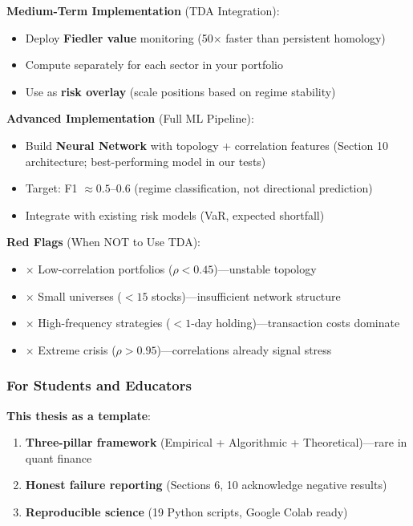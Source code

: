 \textbf{Medium-Term Implementation} (TDA Integration):
\begin{itemize}
\item Deploy \textbf{Fiedler value} monitoring (50$\times$ faster than persistent homology)
\item Compute separately for each sector in your portfolio
\item Use as \textbf{risk overlay} (scale positions based on regime stability)
\end{itemize}

\textbf{Advanced Implementation} (Full ML Pipeline):
\begin{itemize}
\item Build \textbf{Neural Network} with topology + correlation features (Section 10 architecture; best-performing model in our tests)
\item Target: F1 $\approx 0.5$--$0.6$ (regime classification, not directional prediction)
\item Integrate with existing risk models (VaR, expected shortfall)
\end{itemize}

\textbf{Red Flags} (When NOT to Use TDA):
\begin{itemize}
\item $\times$ Low-correlation portfolios ($\rho < 0.45$)---unstable topology
\item $\times$ Small universes ($< 15$ stocks)---insufficient network structure
\item $\times$ High-frequency strategies ($< 1$-day holding)---transaction costs dominate
\item $\times$ Extreme crisis ($\rho > 0.95$)---correlations already signal stress
\end{itemize}

\subsubsection{For Students and Educators}

\textbf{This thesis as a template}:
\begin{enumerate}
\item \textbf{Three-pillar framework} (Empirical + Algorithmic + Theoretical)---rare in quant finance
\item \textbf{Honest failure reporting} (Sections 6, 10 acknowledge negative results)
\item \textbf{Reproducible science} (19 Python scripts, Google Colab ready)
\end{enumerate}

